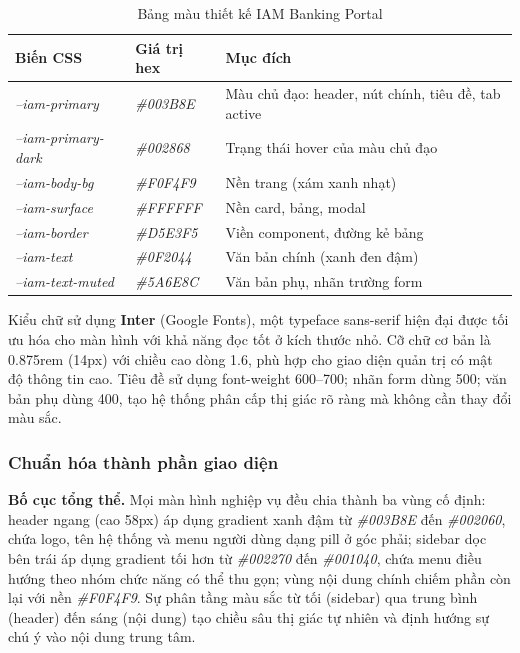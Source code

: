 \documentclass[../DoAn.tex]{subfiles}
\begin{document}
\begin{table}[H]
\centering
\caption{Bảng màu thiết kế IAM Banking Portal}
\label{tab:color-palette}
\begin{tabular}{|l|l|p{5.5cm}|}
\hline
\textbf{Biến CSS} & \textbf{Giá trị hex} & \textbf{Mục đích} \\
\hline
\textit{--iam-primary}      & \textit{\#003B8E} & Màu chủ đạo: header, nút chính, tiêu đề, tab active \\
\hline
\textit{--iam-primary-dark} & \textit{\#002868} & Trạng thái hover của màu chủ đạo \\
\hline
\textit{--iam-body-bg}      & \textit{\#F0F4F9} & Nền trang (xám xanh nhạt) \\
\hline
\textit{--iam-surface}      & \textit{\#FFFFFF} & Nền card, bảng, modal \\
\hline
\textit{--iam-border}       & \textit{\#D5E3F5} & Viền component, đường kẻ bảng \\
\hline
\textit{--iam-text}         & \textit{\#0F2044} & Văn bản chính (xanh đen đậm) \\
\hline
\textit{--iam-text-muted}   & \textit{\#5A6E8C} & Văn bản phụ, nhãn trường form \\
\hline
\end{tabular}
\end{table}

Kiểu chữ sử dụng \textbf{Inter} (Google Fonts), một typeface sans-serif hiện đại được tối ưu hóa cho màn hình với khả năng đọc tốt ở kích thước nhỏ. Cỡ chữ cơ bản là 0.875rem (14px) với chiều cao dòng 1.6, phù hợp cho giao diện quản trị có mật độ thông tin cao. Tiêu đề sử dụng font-weight 600--700; nhãn form dùng 500; văn bản phụ dùng 400, tạo hệ thống phân cấp thị giác rõ ràng mà không cần thay đổi màu sắc.

\subsubsection{Chuẩn hóa thành phần giao diện}

\textbf{Bố cục tổng thể.} Mọi màn hình nghiệp vụ đều chia thành ba vùng cố định: header ngang (cao 58px) áp dụng gradient xanh đậm từ \textit{\#003B8E} đến \textit{\#002060}, chứa logo, tên hệ thống và menu người dùng dạng pill ở góc phải; sidebar dọc bên trái áp dụng gradient tối hơn từ \textit{\#002270} đến \textit{\#001040}, chứa menu điều hướng theo nhóm chức năng có thể thu gọn; vùng nội dung chính chiếm phần còn lại với nền \textit{\#F0F4F9}. Sự phân tầng màu sắc từ tối (sidebar) qua trung bình (header) đến sáng (nội dung) tạo chiều sâu thị giác tự nhiên và định hướng sự chú ý vào nội dung trung tâm.
\end{document}
